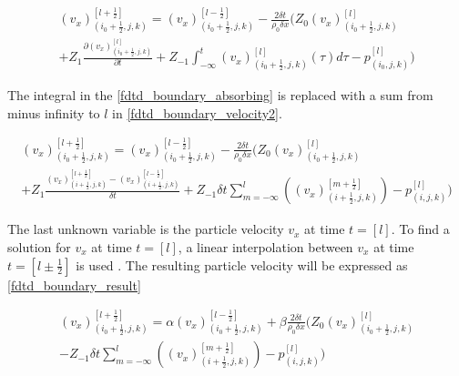 \begin{multline}\label{fdtd_boundary_velocity}
(v_x)_{(i_0+\frac{1}{2},j,k)}^{[l+\frac{1}{2}]}= (v_x)_{(i_0+\frac{1}{2},j,k)}^{[l-\frac{1}{2}]}-\frac{2 \delta t}{\rho_0 \delta x} \Biggl( 
 Z_0(v_x)_{(i_0+\frac{1}{2},j,k)}^{[l]} \\
 +Z_1 \frac{\partial (v_x)_{(i_0+\frac{1}{2},j,k)}^{[l]}}{\partial t} +Z_{-1} \int_{-\infty}^{t} (v_x)_{(i_0+\frac{1}{2},j,k)}^{[l]}(\tau)d\tau -p_{(i_0,j,k)}^{[l]}
\Biggr)
\end{multline}

The integral in the \autoref{fdtd_boundary_absorbing} is replaced with a sum from minus infinity to $l$ in \autoref{fdtd_boundary_velocity2}.

\begin{multline}\label{fdtd_boundary_velocity2}
(v_x)_{(i_0+\frac{1}{2},j,k)}^{[l+\frac{1}{2}]}= (v_x)_{(i_0+\frac{1}{2},j,k)}^{[l-\frac{1}{2}]}-\frac{2 \delta t}{\rho_0 \delta x} \Biggl( 
 Z_0(v_x)_{(i_0+\frac{1}{2},j,k)}^{[l]} \\
+Z_1\frac{(v_x)_{(i+\frac{1}{2},j,k)}^{[l+\frac{1}{2}]}-(v_x)_{(i+\frac{1}{2},j,k)}^{[l-\frac{1}{2}]}}{\delta t}+Z_{-1} \delta t \sum_{m=-\infty}^{l} \left( (v_x)_{(i+\frac{1}{2},j,k)}^{[m+\frac{1}{2}]} \right) -p_{(i,j,k)}^{[l]}
\Biggr)
\end{multline}

The last unknown variable is the particle velocity $v_x$ at time $t=[l]$. To find a solution for $v_x$ at time $t=[l]$, a linear interpolation between $v_x$ at time $t=[l \pm \frac{1}{2}]$ is used \citep{finiteproblems}. The resulting particle velocity will be expressed as \autoref{fdtd_boundary_result}

\begin{multline}\label{fdtd_boundary_result}
(v_x)_{(i_0+\frac{1}{2},j,k)}^{[l+\frac{1}{2}]}= \alpha (v_x)_{(i_0+\frac{1}{2},j,k)}^{[l-\frac{1}{2}]} + \beta \frac{2 \delta t}{\rho_0 \delta x} \Biggl( 
 Z_0(v_x)_{(i_0+\frac{1}{2},j,k)}^{[l]} \\
-Z_{-1} \delta t \sum_{m=-\infty}^{l} \left( (v_x)_{(i+\frac{1}{2},j,k)}^{[m+\frac{1}{2}]} \right) -p_{(i,j,k)}^{[l]}
\Biggr)
\end{multline}


         \startexplain
    \stopexplain



